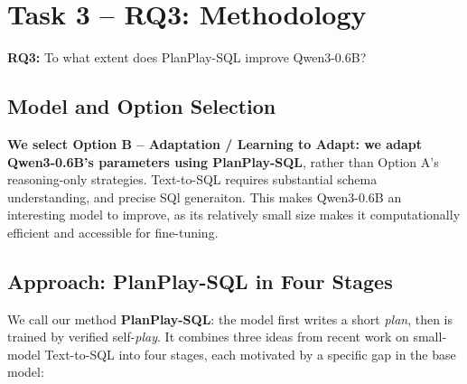 \section{Task 3 -- RQ3: Methodology}
\label{sec:rq3-methodology}

\textbf{RQ3:} To what extent does PlanPlay-SQL improve Qwen3-0.6B?

\subsection{Model and Option Selection}
\label{sec:rq3-model-selection}

\textbf{We select Option B -- Adaptation / Learning to Adapt: we adapt Qwen3-0.6B's parameters using PlanPlay-SQL}, rather than Option A's reasoning-only strategies. Text-to-SQL requires substantial schema understanding, and precise SQl generaiton. This makes Qwen3-0.6B an interesting model to improve, as its relatively small size makes it computationally efficient and accessible for fine-tuning.

\subsection{Approach: PlanPlay-SQL in Four Stages}
\label{sec:rq3-approach}

We call our method \textbf{PlanPlay-SQL}: the model first writes a short \emph{plan}, then is trained by verified self-\emph{play}. It combines three ideas from recent work on small-model Text-to-SQL into four stages, each motivated by a specific gap in the base model:

